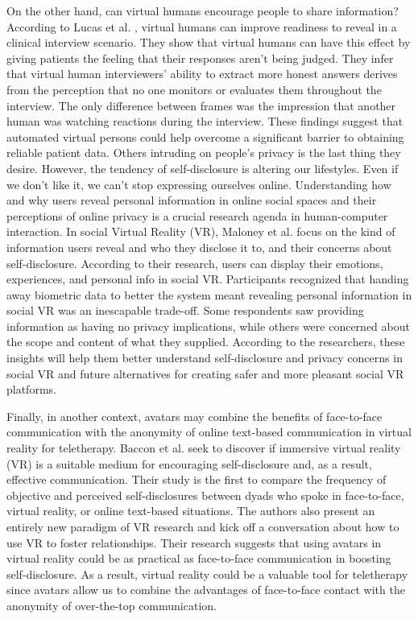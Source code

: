 On the other hand, can virtual humans encourage people to share information? According to Lucas et al. \cite{LUC14}, virtual humans can improve readiness to reveal in a clinical interview scenario. They show that virtual humans can have this effect by giving patients the feeling that their responses aren't being judged. They infer that virtual human interviewers' ability to extract more honest answers derives from the perception that no one monitors or evaluates them throughout the interview. The only difference between frames was the impression that another human was watching reactions during the interview. These findings suggest that automated virtual persons could help overcome a significant barrier to obtaining reliable patient data. Others intruding on people's privacy is the last thing they desire. However, the tendency of self-disclosure is altering our lifestyles. Even if we don't like it, we can't stop expressing ourselves online. Understanding how and why users reveal personal information in online social spaces and their perceptions of online privacy is a crucial research agenda in human-computer interaction. In social Virtual Reality (VR), Maloney et al. \cite{MAL20} focus on the kind of information users reveal and who they disclose it to, and their concerns about self-disclosure. According to their research, users can display their emotions, experiences, and personal info in social VR. Participants recognized that handing away biometric data to better the system meant revealing personal information in social VR was an inescapable trade-off. Some respondents saw providing information as having no privacy implications, while others were concerned about the scope and content of what they supplied. According to the researchers, these insights will help them better understand self-disclosure and privacy concerns in social VR and future alternatives for creating safer and more pleasant social VR platforms.

Finally, in another context, avatars may combine the benefits of face-to-face communication with the anonymity of online text-based communication in virtual reality for teletherapy. Baccon et al. \cite{BAC19} seek to discover if immersive virtual reality (VR) is a suitable medium for encouraging self-disclosure and, as a result, effective communication. Their study is the first to compare the frequency of objective and perceived self-disclosures between dyads who spoke in face-to-face, virtual reality, or online text-based situations. The authors also present an entirely new paradigm of VR research and kick off a conversation about how to use VR to foster relationships. Their research suggests that using avatars in virtual reality could be as practical as face-to-face communication in boosting self-disclosure. As a result, virtual reality could be a valuable tool for teletherapy since avatars allow us to combine the advantages of face-to-face contact with the anonymity of over-the-top communication.

